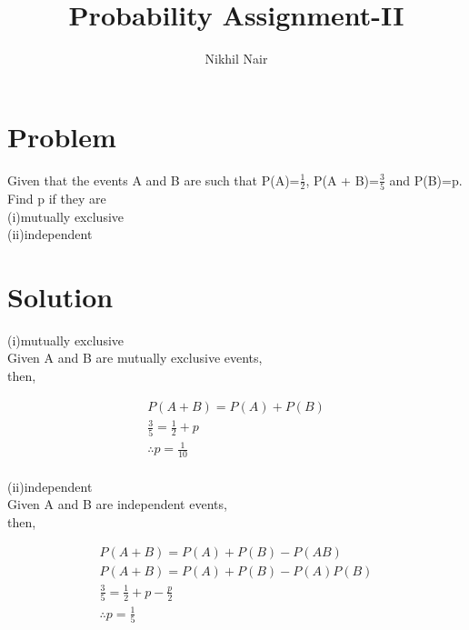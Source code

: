 \documentclass[journal,12pt,twocolumn]{IEEEtran}
\title{\mytitle}
\title{
Probability Assignment-II
}
\author{Nikhil Nair}
\begin{document}
\maketitle
\bigskip



\section{\textbf{Problem }}
Given that the events A and B are such that P(A)=$\frac{1}{2}$, P(A + B)=$\frac{3}{5}$ and P(B)=p. Find p if they are \\
(i)mutually exclusive\\
(ii)independent


\section{\textbf{Solution }}

(i)mutually exclusive
\\
Given A and B are mutually exclusive events,\\
then,

\begin{align}
P(A + B) =P(A) + P(B)
\\
\frac{3}{5}=\frac{1}{2}+p
\\
\therefore  p = \frac{1}{10}
\end{align}
\\

(ii)independent
\\
Given A and B are independent events,\\
then,

\begin{align}
P(A + B) =P(A) + P(B) - P(A B)
\\
P(A + B) =P(A) + P(B) - P(A)P(B)
\\
\frac{3}{5}=\frac{1}{2}+ p - \frac{p}{2}
\\
\therefore p = \frac{1}{5}
\end{align}
\end{document}
